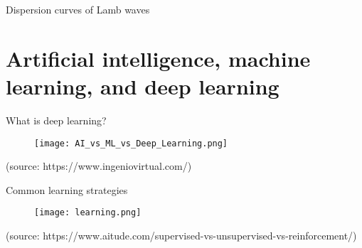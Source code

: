 \documentclass[10pt,aspectratio=169,dvipsnames]{beamer} %
\begin{document}
		\begin{frame}{Dispersion curves of Lamb waves}
			\begin{figure}
			\end{figure}
		\end{frame}
	\setcounter{subfigure}{0}
	\section{Artificial intelligence, machine learning, and deep learning}
	\begin{frame}{What is deep learning?}
		\begin{figure}
			\centering
			\texttt{[image: AI\_vs\_ML\_vs\_Deep\_Learning.png]}
		\end{figure}
		\tiny
		(source: https://www.ingeniovirtual.com/)
	\end{frame}	
%		
	\setcounter{subfigure}{0}
	\begin{frame}{Common learning strategies}
		\centering
		\begin{figure}
			\texttt{[image: learning.png]}
		\end{figure}
		\tiny
		(source: https://www.aitude.com/supervised-vs-unsupervised-vs-reinforcement/)
	\end{frame}
	
\end{document}
